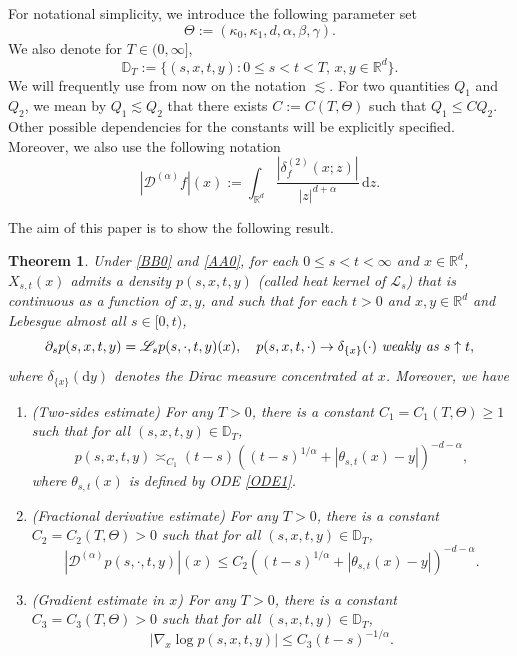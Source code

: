 \documentclass[JEP,XML,SOM,Unicode,published]{cedram}
\newcommand{\rd}{\mathrm{d}}
\theoremstyle{plain}
\newtheorem{theorem}{Theorem}[section]
\theoremstyle{definition}
\let\p\partial
\newcommand\cD{{\mathcal D}}
\newcommand\mD{\mathbb{D}}
\newcommand\mR{\mathbb{R}}
\newcommand\1{{\mathbf{1}}}
\newcommand\sL{{\mathscr L}}
\begin{document}
For notational simplicity, we introduce the following parameter set
\begin{equation}\label{DEF_THETA}
\Theta:=(\kappa_0,\kappa_1,d,\alpha,\beta,\gamma).
\end{equation}
We also denote for $T\in(0,\infty]$,
\[
\mD_T:=\{(s,x,t,y): 0\leq s<t<T,\, x,y\in\mR^d\}.
\]
We will frequently use from now on the notation $\lesssim$. For two quantities $Q_1$ and $Q_2$, we mean by
$Q_1\lesssim Q_2 $ that there exists $C:=C(T,\Theta)$ such that $Q_1\le CQ_2 $. Other possible dependencies for the constants will be explicitly specified.
Moreover, we also use the following notation
\begin{equation}\label{DA0}
|\cD^{(\alpha)} f|(x):=\int_{\mR^d}\frac{|\delta^{(2)}_f(x;z)|}{|z|^{d+\alpha}}\,\rd z.
\end{equation}

The aim of this paper is to show the following result.
\begin{theorem}\label{Main}
Under \eqref{BB0} and \eqref{AA0}, for each $0\leq s<t<\infty$ and $x\in\mR^d$, $X_{s,t}(x)$ admits a density $p(s,x,t,y)$
(called heat kernel of $\sL_{s}$) that is continuous as a function of $x,y$, and such that for each $t>0$ and $x,y\in\mR^d$ and Lebesgue almost all $s\in[0,t)$,
\[
\p_s p(s,x,t,y)=\sL_{s}p(s,\cdot,t,y)(x),\quad p(s,x,t,\cdot)\rightarrow \delta_{\{x\}}(\cdot)\ {\rm \it weakly\ as}\ s\uparrow t,
\]
where $\delta_{\{x\}}(\rd y)$ denotes the Dirac measure concentrated at $x$.
Moreover, we have
\begin{enumerate}
\item (Two-sides estimate) For any $T>0$, there is a constant $C_1=C_1(T,\Theta)\ge 1$ such that for all $(s,x,t,y)\in\mD_T$,
\begin{equation}\label{TW}
p(s,x,t,y)\asymp_{C_1} (t-s)((t-s)^{1/\alpha}+|\theta_{s,t}(x)-y|)^{-d-\alpha},
\end{equation}
where $\theta_{s,t}(x)$ is defined by ODE \eqref{ODE1}.
\item (Fractional derivative estimate) For any $T>0$, there is a constant $C_2=C_2(T,\Theta)>0$ such that for all $(s,x,t,y)\in\mD_T$,
\begin{equation*}%
|\cD^{(\alpha)}p(s,\cdot,t,y)|(x) \le {C_2} ((t-s)^{1/\alpha}+|\theta_{s,t}(x)-y|)^{-d-\alpha}.
\end{equation*}
\item (Gradient estimate in $x$) For any $T>0$, there is a constant $C_3=C_3(T,\Theta)>0$ such that for all $(s,x,t,y)\in\mD_T$,
\begin{equation}\label{GR0}
|\nabla_x\log p(s,x,t,y)|\le {C_3} (t-s)^{-1/\alpha}.
\end{equation}
\end{enumerate}
\end{theorem}
\end{document}
